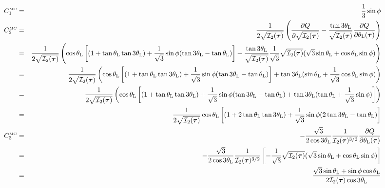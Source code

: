 \begin{eqnarray}
C_1^{\text{\tiny MC}} &=& \frac13 \sin\phi  \\ 
C_2^{\text{\tiny MC}} 
&=& 
\frac{1}{2 \sqrt{ {\cal I}_2(\bm\tau)}   }   
\left( \frac{\partial Q}{\partial \sqrt{{\cal I}_2(\bm\tau)}} 
- \frac{\tan 3\theta_{\rm L}}{\sqrt {{\cal I}_2(\bm\tau)}}
\frac{\partial Q}{\partial \theta_{\rm L}(\bm\tau)}  
\right) \nonumber\\
&=& 
\frac{1}{2 \sqrt{ {\cal I}_2(\bm\tau)}   }   
\left( \cos \theta_{\rm L} \left[
(1 +  \tan \theta_{\rm L}   \tan 3\theta_{\rm L})
+\frac{1}{\sqrt{3}} \sin\phi ( \tan 3\theta_{\rm L} - \tan\theta_{\rm L}) \right]
+ \frac{\tan 3\theta_{\rm L}}{\sqrt {{\cal I}_2(\bm\tau)}}
\frac{1}{\sqrt{3}} \sqrt{{\cal I}_2(\bm \tau)} (\sqrt{3} \sin\theta_{\rm L}+\cos\theta_{\rm L} \sin\phi )
\right) \nonumber\\
&=& 
\frac{1}{2 \sqrt{ {\cal I}_2(\bm\tau)}   }   
\left( \cos \theta_{\rm L}
\left[ (1 +  \tan \theta_{\rm L}   \tan 3\theta_{\rm L})
+\frac{1}{\sqrt{3}} \sin\phi
( \tan 3\theta_{\rm L} - \tan\theta_{\rm L}) \right]
+ \tan 3\theta_{\rm L}  ( \sin\theta_{\rm L}+\frac{1}{\sqrt{3}}\cos\theta_{\rm L} \sin\phi )
\right) \nonumber\\
&=& 
\frac{1}{2 \sqrt{ {\cal I}_2(\bm\tau)}   }   
\left( \cos \theta_{\rm L} \left[
(1 +  \tan \theta_{\rm L}   \tan 3\theta_{\rm L})
+\frac{1}{\sqrt{3}} \sin\phi
( \tan 3\theta_{\rm L} - \tan\theta_{\rm L})
+ \tan 3\theta_{\rm L}   ( \tan\theta_{\rm L}+\frac{1}{\sqrt{3}} \sin\phi )
\right] \right) \nonumber\\
&=& 
\frac{1}{2 \sqrt{ {\cal I}_2(\bm\tau)}   }   
\cos \theta_{\rm L} \left[
(1 +  2\tan \theta_{\rm L}   \tan 3\theta_{\rm L})
+\frac{1}{\sqrt{3}} \sin\phi ( 2\tan 3\theta_{\rm L} - \tan\theta_{\rm L})
\right] \nonumber\\
C_3^{\text{\tiny MC}} 
&=&  - \frac{\sqrt{3}}{2\cos 3\theta_{\rm L}}
\frac{1}{{\cal I}_2(\bm\tau)^{3/2}} 
\frac{\partial Q}{\partial \theta_{\rm L}(\bm\tau)} \nonumber\\ 
&=&  - \frac{\sqrt{3}}{2\cos 3\theta_{\rm L}}
\frac{1}{{\cal I}_2(\bm\tau)^{3/2}} 
\left[-\frac{1}{\sqrt{3}} \sqrt{{\cal I}_2(\bm \tau)} (\sqrt{3} \sin\theta_{\rm L}+\cos\theta_{\rm L} 
\sin\phi ) \right]  \nonumber\\
&=&  \frac{\sqrt{3}\sin\theta_{\rm L} +  \sin \phi \cos \theta_{\rm L}}
{2 {\cal I}_2({\bm \tau}) \cos 3\theta_{\rm L}}
\end{eqnarray}










